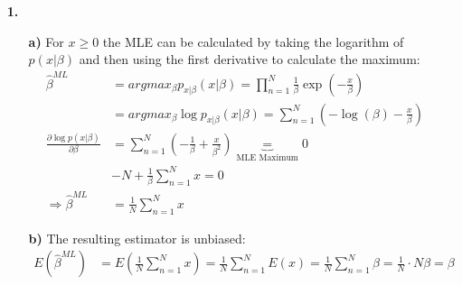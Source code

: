 \documentclass[a4paper,11pt]{article}
\author{\authorinfotitle}
\title{\titleinfo}
\date{\today}
\begin{document}
	\maketitle
	\begin{enumerate}
		\item[\textbf{1.}]
		
		\begin{enumerate}
		\item[\textbf{a)}]
		For $x \geq 0$ the MLE can be calculated by taking the logarithm of $p(x|\beta)$ and then using the first derivative to calculate the maximum:
		\begin{align*}
		\hat{\beta}^{ML} &= argmax_\beta p_{x|\beta}(x|\beta) = \prod_{n=1}^{N}\frac{1}{\beta}\exp(-\frac{x}{\beta}) \\
		&= argmax_\beta \log p_{x|\beta}(x|\beta) = \sum_{n=1}^{N} (-\log(\beta)-\frac{x}{\beta}) \\
		\frac{\partial \log p(x|\beta)}{\partial \beta} &= \sum_{n=1}^{N} (-\frac{1}{\beta}+\frac{x}{\beta^2}) \underbrace{=}_{\text{MLE Maximum}} 0 \\
		&-N + \frac{1}{\beta} \sum_{n=1}^{N} x = 0 \\
		\Rightarrow \hat{\beta}^{ML} &= \frac{1}{N} \sum_{n=1}^{N} x
		\end{align*}
		\item[\textbf{b)}]
		The resulting estimator is unbiased:
		\begin{align*}
		E(\hat{\beta}^{ML}) &= E(\frac{1}{N} \sum_{n=1}^{N} x) = \frac{1}{N} \sum_{n=1}^{N} E(x) = \frac{1}{N} \sum_{n=1}^{N} \beta = \frac{1}{N} \cdot N\beta = \beta
		\end{align*}
		
		\end{enumerate}

	\end{enumerate}
\end{document}
